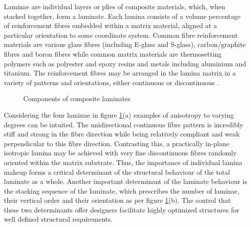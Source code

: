 Laminae are individual layers or plies of composite materials, which, when stacked together, form a laminate. Each lamina consists of a volume percentage of reinforcement fibres embedded within a matrix material, aligned at a particular orientation to some coordinate system. Common fibre reinforcement materials are various glass fibres (including E-glass and S-glass), carbon/graphite fibres and boron fibres while common matrix materials are thermosetting polymers such as polyester and epoxy resins and metals including aluminium and titanium. The reinforcement fibres may be arranged in the lamina matrix in a variety of patterns and orientations, either continuous or discontinuous \cite{agarwal2006analysis}. 
\begin{figure}[H]
	\caption{\label{composite_laminates}Components of composite laminates \cite{reddy2004mechanics}}
\end{figure}

Considering the four laminae in figure \ref{composite_laminates}(a) examples of anisotropy to varying degrees can be intuited. The unidirectional continuous fibre pattern is incredibly stiff and strong in the fibre direction while being relatively compliant and weak  perpendicular to this fibre direction. Contrasting this, a practically in-plane isotropic lamina may be achieved with very fine discontinuous fibres randomly oriented within the matrix substrate. Thus, the importance of individual lamina makeup forms a critical determinant of the structural behaviour of the total laminate as a whole. Another important determinant of the laminate behaviour is the stacking sequence of the laminate, which prescribes the number of laminae, their vertical order and their orientation as per figure \ref{composite_laminates}(b). The control that these two determinants offer designers facilitate highly optimized structures for well defined structural requirements.

